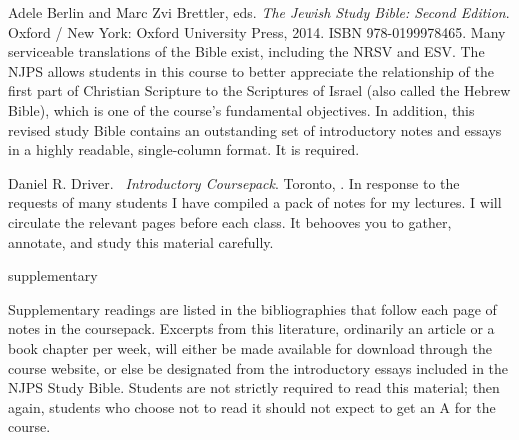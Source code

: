 \documentclass[titlepage]{article}
\begin{document}
\begingroup
\renewcommand{\section}[2]{}%
\begin{thebibliography}{Heschel}%

	Adele Berlin and Marc Zvi Brettler, eds.
    \emph{The Jewish Study Bible: Second Edition}.
    Oxford / New York: Oxford University Press, 2014.
    ISBN 978-0199978465.
	Many serviceable translations of the Bible exist, including the NRSV
	and ESV. The NJPS allows students in this course to better
	appreciate the relationship of the first part of Christian Scripture
	to the Scriptures of Israel (also called the Hebrew Bible), which is
	one of the course's fundamental objectives. In addition, this
	revised study Bible contains an outstanding set of introductory
	notes and essays in a highly readable, single-column format. It is
	required.



	 Daniel R. Driver. \emph{\ctitle\ Introductory
	Coursepack}. Toronto, \csemester. In response to the requests of
	many students I have compiled a pack of notes for my lectures. I
	will circulate the relevant pages before each class. It behooves you
	to gather, annotate, and study this material carefully.

\end{thebibliography}
\endgroup

\section{Supplementary Texts}
\label{supplementary}

Supplementary readings are listed in the bibliographies that follow each
page of notes in the coursepack. Excerpts from this literature,
ordinarily an article or a book chapter per week, will either be made
available for download through the course website, or else be designated
from the introductory essays included in the NJPS Study Bible. Students
are not strictly required to read this material; then again, students
who choose not to read it should not expect to get an A for the course.
\end{document}
